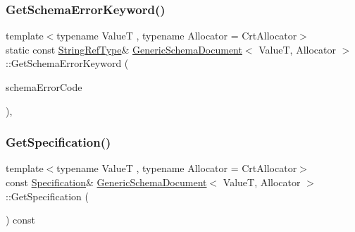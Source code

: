 \subsubsection{\texorpdfstring{Get\+Schema\+Error\+Keyword()}{GetSchemaErrorKeyword()}}
{\footnotesize\ttfamily template$<$typename ValueT , typename Allocator  = Crt\+Allocator$>$ \\
static const \hyperlink{classGenericSchemaDocument_adc77ed1f500a224582385ff730de1aa3}{String\+Ref\+Type}\& \hyperlink{classGenericSchemaDocument}{Generic\+Schema\+Document}$<$ ValueT, Allocator $>$\+::Get\+Schema\+Error\+Keyword (\begin{DoxyParamCaption}\item[{\hyperlink{group__RAPIDJSON__ERRORS_ga64f496d2cee8c9673f3105ec6008f290}{Schema\+Error\+Code}}]{schema\+Error\+Code }\end{DoxyParamCaption})\hspace{0.3cm}{\ttfamily [inline]}, {\ttfamily [static]}}

\mbox{\label{classGenericSchemaDocument_a88b62382579b70f769f95de5474a59b1}} 
\subsubsection{\texorpdfstring{Get\+Specification()}{GetSpecification()}\hspace{0.1cm}{\footnotesize\ttfamily [1/2]}}
{\footnotesize\ttfamily template$<$typename ValueT , typename Allocator  = Crt\+Allocator$>$ \\
const \hyperlink{structSpecification}{Specification}\& \hyperlink{classGenericSchemaDocument}{Generic\+Schema\+Document}$<$ ValueT, Allocator $>$\+::Get\+Specification (\begin{DoxyParamCaption}{ }\end{DoxyParamCaption}) const\hspace{0.3cm}{\ttfamily [inline]}}

\mbox{\label{classGenericSchemaDocument_a9c47f4621a9e782f0de037bb1449ba9c}} 
